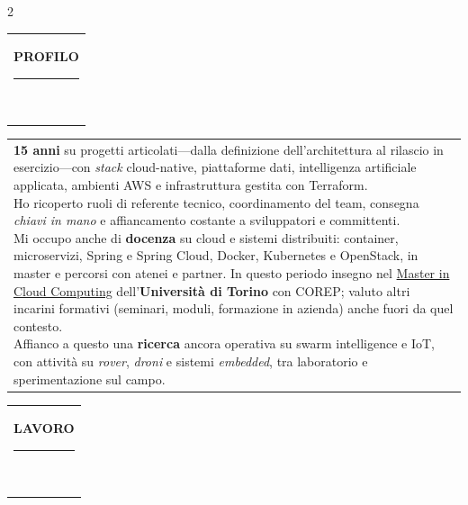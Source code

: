 \documentclass[10pt,A4]{article}
\newcommand{\mpwidth}{\linewidth-\fboxsep-\fboxsep}
\newcommand{\cvtext}[1] {
	\begin{tabular*}{1\mpwidth}{p{0.98\mpwidth}}
		\parbox{1\mpwidth}{#1}
	\end{tabular*}
}
\newcommand{\cvsection}[1] {
	\vspace{14pt}
	\cvtext{
		\textbf{\LARGE{\textcolor{darkcol}{\uppercase{#1}}}}\\[-4pt]
		\textcolor{maincol}{ \rule{0.1\textwidth}{2pt} } \\
	}
}
\begin{document}
\begin{paracol}{2}
\begin{rightcolumn}
\vspace{8pt}
\cvsection{PROFILO}

\cvtext{\textbf{15 anni} su progetti articolati---dalla definizione dell'architettura al rilascio in esercizio---con \emph{stack} cloud-native, piattaforme dati, intelligenza artificiale applicata, ambienti AWS e infrastruttura gestita con Terraform.\\ Ho ricoperto ruoli di referente tecnico, coordinamento del team, consegna \emph{chiavi in mano} e affiancamento costante a sviluppatori e committenti.\\[7pt]
Mi occupo anche di \textbf{docenza} su cloud e sistemi distribuiti: container, microservizi, Spring e Spring Cloud, Docker, Kubernetes e OpenStack, in master e percorsi con atenei e partner. In questo periodo insegno nel \href{https://www.mastercloudcomputing.it/}{Master in Cloud Computing} dell'\textbf{Università di Torino} con COREP; valuto altri incarini formativi (seminari, moduli, formazione in azienda) anche fuori da quel contesto.\\[7pt]
Affianco a questo una \textbf{ricerca} ancora operativa su swarm intelligence e IoT, con attività su \emph{rover}, \emph{droni} e sistemi \emph{embedded}, tra laboratorio e sperimentazione sul campo.}

\vspace{16pt}
\cvsection{LAVORO}


\end{rightcolumn}
\end{paracol}
\end{document}
